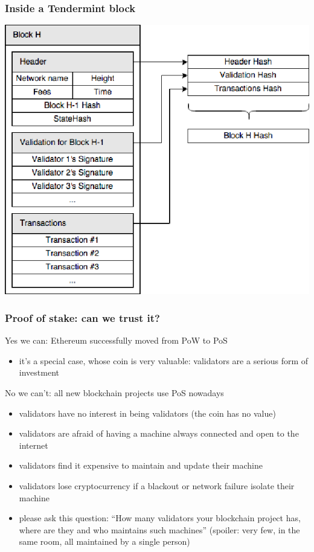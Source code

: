 \documentclass[11pt]{beamer}  %
\begin{document}
\begin{frame}\frametitle{Inside a Tendermint block}

  \begin{center}
    \includegraphics[scale=.38,clip=false]{pictures/tendermint-block.png}
  \end{center}

\end{frame}

\begin{frame}\frametitle{Proof of stake: can we trust it?}

  \begin{greenbox}{Yes we can: Ethereum successfully moved from PoW to PoS}
    \begin{itemize}
    \item it's a special case, whose coin is very valuable: validators are a serious form of investment
    \end{itemize}
  \end{greenbox}

  \bigskip
  
  \begin{redbox}{No we can't: all new blockchain projects use PoS nowadays}
    \begin{itemize}
    \item validators have no interest in being validators (the coin has no value)
    \item validators are afraid of having a machine always connected and open to the internet
    \item validators find it expensive to maintain and update their machine
    \item validators lose cryptocurrency if a blackout or network failure isolate their machine
    \item please ask this question: ``How many validators your blockchain project has, where are they and who maintains such machines'' (spoiler: very few, in the same room, all maintained by a single person)
    \end{itemize}
  \end{redbox}

\end{frame}
\end{document}
